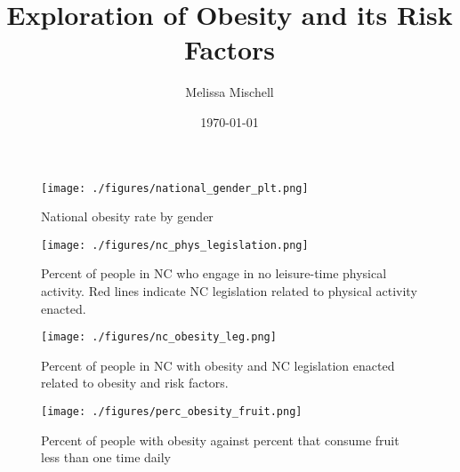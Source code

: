 \documentclass[11pt]{article}
\title{Exploration of Obesity and its Risk Factors}
\author{Melissa Mischell}
\date{\today}
\begin{document}
\maketitle

\begin{figure}[h]
\texttt{[image: ./figures/national\_gender\_plt.png]}
\caption{National obesity rate by gender}
\label{fig:gender}
\end{figure}

\begin{figure}[h]
\texttt{[image: ./figures/nc\_phys\_legislation.png]}
\caption{
  Percent of people in NC who engage in no leisure-time physical activity. 
  Red lines indicate NC legislation related to physical activity enacted.
}
\label{fig:phys_act}
\end{figure}

\begin{figure}[h]
\texttt{[image: ./figures/nc\_obesity\_leg.png]}
\caption{
  Percent of people in NC with obesity and NC legislation enacted related to obesity and risk factors. 
}
\label{fig:nc_obesity}
\end{figure}


\begin{figure}[h]
\texttt{[image: ./figures/perc\_obesity\_fruit.png]}
\caption{
  Percent of people with obesity against percent that consume fruit less than one time daily
}
\label{fig:obesity_fruit}
\end{figure}
\end{document}
